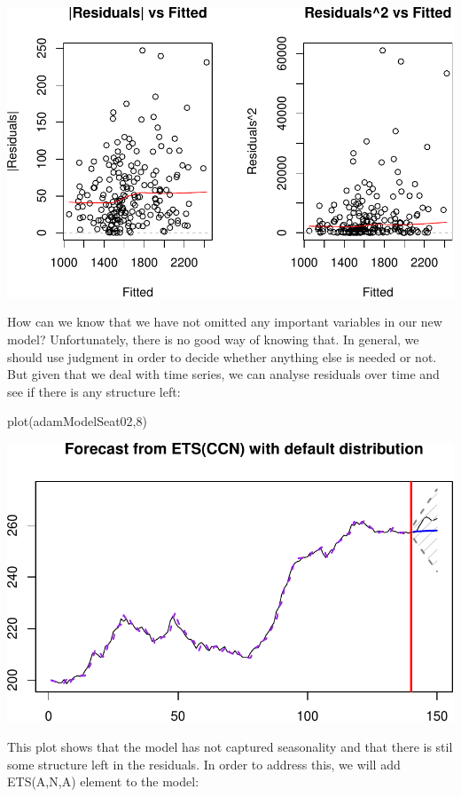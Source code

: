 \documentclass[
]{book}
\newenvironment{Shaded}{\begin{snugshade}}{\end{snugshade}}
\newcommand{\DecValTok}[1]{\textcolor[rgb]{0.00,0.00,0.81}{#1}}
\newcommand{\FunctionTok}[1]{\textcolor[rgb]{0.00,0.00,0.00}{#1}}
\newcommand{\NormalTok}[1]{#1}
\theoremstyle{definition}
\theoremstyle{definition}
\theoremstyle{definition}
\theoremstyle{definition}
\theoremstyle{remark}
\begin{document}
\includegraphics{adam_files/figure-latex/unnamed-chunk-125-1.pdf}

How can we know that we have not omitted any important variables in our new model? Unfortunately, there is no good way of knowing that. In general, we should use judgment in order to decide whether anything else is needed or not. But given that we deal with time series, we can analyse residuals over time and see if there is any structure left:

\begin{Shaded}
\begin{Highlighting}[]
\FunctionTok{plot}\NormalTok{(adamModelSeat02,}\DecValTok{8}\NormalTok{)}
\end{Highlighting}
\end{Shaded}

\includegraphics{adam_files/figure-latex/unnamed-chunk-126-1.pdf}

This plot shows that the model has not captured seasonality and that there is stil some structure left in the residuals. In order to address this, we will add ETS(A,N,A) element to the model:
\end{document}
